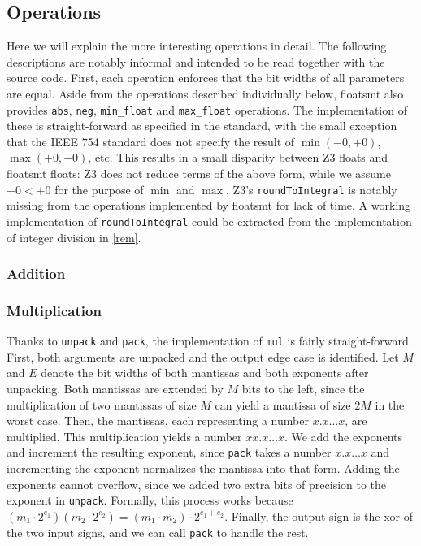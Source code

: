 \documentclass[a4paper,UKenglish,cleveref, autoref, thm-restate]{lipics-v2019}
\begin{document}
\subsection{Operations}
Here we will explain the more interesting operations in detail. The following descriptions are notably informal and intended to be read together with the source code. First, each operation enforces that the bit widths of all parameters are equal. Aside from the operations described individually below, floatsmt also provides \verb|abs|, \verb|neg|, \verb|min_float| and \verb|max_float| operations. The implementation of these is straight-forward as specified in the standard, with the small exception that the IEEE 754 standard does not specify the result of $\min(-0, +0)$, $\max(+0, -0)$, etc. This results in a small disparity between Z3 floats and floatsmt floats: Z3 does not reduce terms of the above form, while we assume $-0 < +0$ for the purpose of $\min$ and $\max$. Z3's \verb|roundToIntegral| is notably missing from the operations implemented by floatsmt for lack of time. A working implementation of \verb|roundToIntegral| could be extracted from the implementation of integer division in \cref{rem}.

\subsubsection{Addition}

\subsubsection{Multiplication}
Thanks to \verb|unpack| and \verb|pack|, the implementation of \verb|mul| is fairly straight-forward. First, both arguments are unpacked and the output edge case is identified. 
Let $M$ and $E$ denote the bit widths of both mantissas and both exponents after unpacking.
Both mantissas are extended by $M$ bits to the left, since the multiplication of two mantissas of size $M$ can yield a mantissa of size $2M$ in the worst case. Then, the mantissas, each representing a number $x.x\dots x$, are multiplied. This multiplication yields a number $xx.x\dots x$. We add the exponents and increment the resulting exponent, since \verb|pack| takes a number $x.x \dots x$ and incrementing the exponent normalizes the mantissa into that form. Adding the exponents cannot overflow, since we added two extra bits of precision to the exponent in \verb|unpack|. Formally, this process works because $(m_1 \cdot 2^{e_1})(m_2 \cdot 2^{e_2}) = (m_1 \cdot m_2) \cdot 2^{e_1 + e_2}$. Finally, the output sign is the xor of the two input signs, and we can call \verb|pack| to handle the rest.
\end{document}
